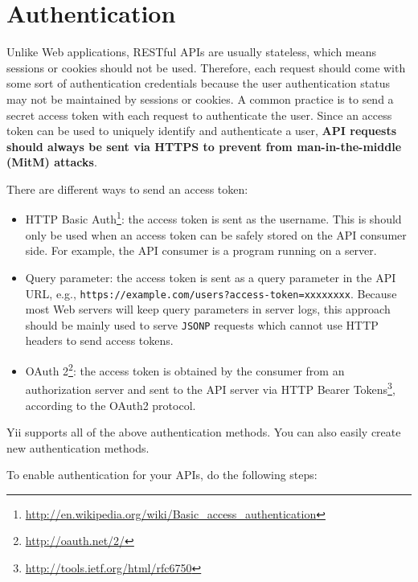 \label{rest-authentication.md}\section{Authentication}
Unlike Web applications, RESTful APIs are usually stateless, which means sessions or cookies should not
be used. Therefore, each request should come with some sort of authentication credentials because
the user authentication status may not be maintained by sessions or cookies. A common practice is
to send a secret access token with each request to authenticate the user. Since an access token
can be used to uniquely identify and authenticate a user, \textbf{API requests should always be sent
via HTTPS to prevent from man-in-the-middle (MitM) attacks}.

There are different ways to send an access token:

\begin{itemize}
\item HTTP Basic Auth\footnote{\url{http://en.wikipedia.org/wiki/Basic\_access\_authentication}}: the access token
is sent as the username. This is should only be used when an access token can be safely stored
on the API consumer side. For example, the API consumer is a program running on a server.
\item Query parameter: the access token is sent as a query parameter in the API URL, e.g.,
\lstinline|https://example.com/users?access-token=xxxxxxxx|. Because most Web servers will keep query
parameters in server logs, this approach should be mainly used to serve \lstinline|JSONP| requests which
cannot use HTTP headers to send access tokens.
\item OAuth 2\footnote{\url{http://oauth.net/2/}}: the access token is obtained by the consumer from an authorization
server and sent to the API server via HTTP Bearer Tokens\footnote{\url{http://tools.ietf.org/html/rfc6750}},
according to the OAuth2 protocol.
\end{itemize}
Yii supports all of the above authentication methods. You can also easily create new authentication methods.

To enable authentication for your APIs, do the following steps:

